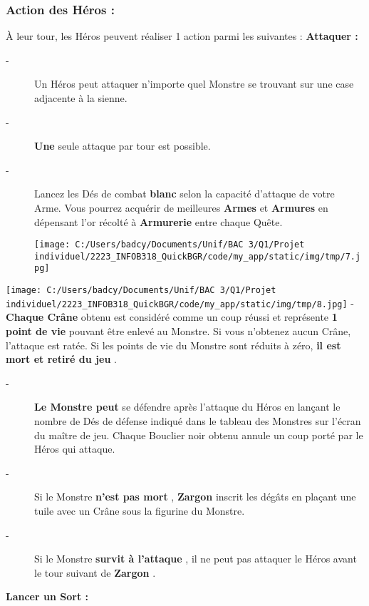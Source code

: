 \documentclass{scrartcl}%
\begin{document}
%
\subsubsection{ Action des Héros :
}%
\label{ssubsec:ActiondesHros}%
À leur tour, les Héros peuvent réaliser 1 action parmi les suivantes :
%
\textbf{Attaquer :}%

%
\begin{description}%
\item[{-} ]%
%
 Un Héros peut attaquer n’importe quel Monstre se trouvant sur une case adjacente à la sienne.
%
\item[{-} ]%
%
\textbf{Une}%
\textit{ }%
 seule attaque par tour est possible.
%
\item[{-} ]%
%
 Lancez les Dés de combat %
\textbf{blanc}%
\textit{ }%
 selon la capacité d'attaque de votre Arme. Vous pourrez acquérir de meilleures%
\textbf{ Armes}%
\textit{ }%
 et %
\textbf{Armures}%
\textit{ }%
 en dépensant l'or récolté à %
\textbf{Armurerie}%
\textit{ }%
 entre chaque Quête.%
\begin{center}\texttt{[image: C:/Users/badcy/Documents/Unif/BAC 3/Q1/Projet individuel/2223\_INFOB318\_QuickBGR/code/my\_app/static/img/tmp/7.jpg]}\end{center}%

%
\end{description}%
%
\texttt{[image: C:/Users/badcy/Documents/Unif/BAC 3/Q1/Projet individuel/2223\_INFOB318\_QuickBGR/code/my\_app/static/img/tmp/8.jpg]}%
{-} %
\textbf{Chaque Crâne}%
\textit{ }%
 obtenu est considéré comme un coup réussi et représente %
\textbf{1 point de vie}%
\textit{ }%
 pouvant être enlevé au Monstre. Si vous n’obtenez aucun Crâne, l'attaque est ratée. Si les points de vie du Monstre sont réduits à zéro,%
\textbf{ il est mort et retiré du jeu}%
.
%
\begin{description}%
\item[{-} ]%
%
\textbf{Le Monstre peut}%
\textit{ }%
 se défendre après l’attaque du Héros en lançant le nombre de Dés de défense indiqué dans le tableau des Monstres sur l'écran du maître de jeu. Chaque Bouclier noir obtenu annule un coup porté par le Héros qui attaque.
%
\item[{-} ]%
%
 Si le Monstre%
\textbf{ n'est pas mort}%
, %
\textbf{Zargon}%
inscrit les dégâts en plaçant une tuile avec un Crâne sous la figurine du Monstre.
%
\item[{-} ]%
%
 Si le Monstre %
\textbf{survit à l'attaque}%
, il ne peut pas attaquer le Héros avant le tour suivant de%
\textbf{ Zargon}%
. 
%
\end{description}%
\textbf{Lancer un Sort :}%
\end{document}
